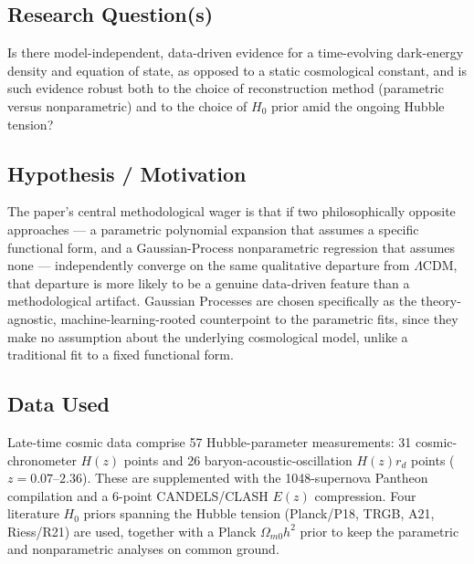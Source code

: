 \documentclass[11pt]{article}
\begin{document}
\subsection{Research Question(s)}
Is there model-independent, data-driven evidence for a time-evolving dark-energy density and equation of state, as opposed to a static cosmological constant, and is such evidence robust both to the choice of reconstruction method (parametric versus nonparametric) and to the choice of $H_0$ prior amid the ongoing Hubble tension?

\subsection{Hypothesis / Motivation}
The paper's central methodological wager is that if two philosophically opposite approaches — a parametric polynomial expansion that assumes a specific functional form, and a Gaussian-Process nonparametric regression that assumes none — independently converge on the same qualitative departure from $\Lambda$CDM, that departure is more likely to be a genuine data-driven feature than a methodological artifact. Gaussian Processes are chosen specifically as the theory-agnostic, machine-learning-rooted counterpoint to the parametric fits, since they make no assumption about the underlying cosmological model, unlike a traditional fit to a fixed functional form.

\subsection{Data Used}
Late-time cosmic data comprise 57 Hubble-parameter measurements: 31 cosmic-chronometer $H(z)$ points and 26 baryon-acoustic-oscillation $H(z)r_d$ points ($z=0.07$--$2.36$). These are supplemented with the 1048-supernova Pantheon compilation and a 6-point CANDELS/CLASH $E(z)$ compression. Four literature $H_0$ priors spanning the Hubble tension (Planck/P18, TRGB, A21, Riess/R21) are used, together with a Planck $\Omega_{m0}h^2$ prior to keep the parametric and nonparametric analyses on common ground.
\end{document}

